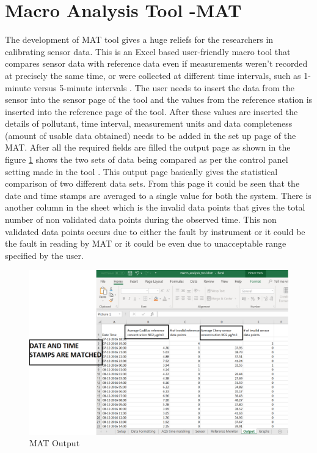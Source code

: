 \documentclass[12pt,a4paper,oneside]{report}
\begin{document}
\section*{Macro Analysis Tool -MAT}
The development of MAT tool gives a huge reliefs for the researchers in calibrating sensor data. This is an Excel based user-friendly macro tool that compares sensor data with reference data \cite{National2017} even if measurements weren’t recorded at precisely the same time, or were collected at different time intervals, such as 1-minute versus 5-minute intervals \cite{mattool}. The user needs to insert the data from the sensor into the sensor page of the tool and the values from the reference station is inserted into the reference page of the tool. After these values are inserted the details of pollutant, time interval, measurement units and data completeness (amount of usable data obtained) needs to be added in the set up page of the MAT. After all the required fields are filled the output page as shown in the figure \ref{MAT} shows the two sets of data being compared as per the control panel setting made in the tool \cite{National2017}.
This output page basically gives the statistical comparison of two different data sets. From this page it could be seen that the date and time stamps are averaged to a single value for both the system. There is another column in the sheet which is the invalid data points that gives the total number of non validated data points during the observed time. This non validated data points occurs due to either the fault by instrument or it could be the fault in reading by MAT or it could be even due to unacceptable range specified by the user.

\begin{figure}[h]
    \begin{center}
    \includegraphics[scale=0.35]{images/figure6.png}
    \end{center}
    \caption{MAT Output}
    \label{MAT}
  \end{figure}
\end{document}
